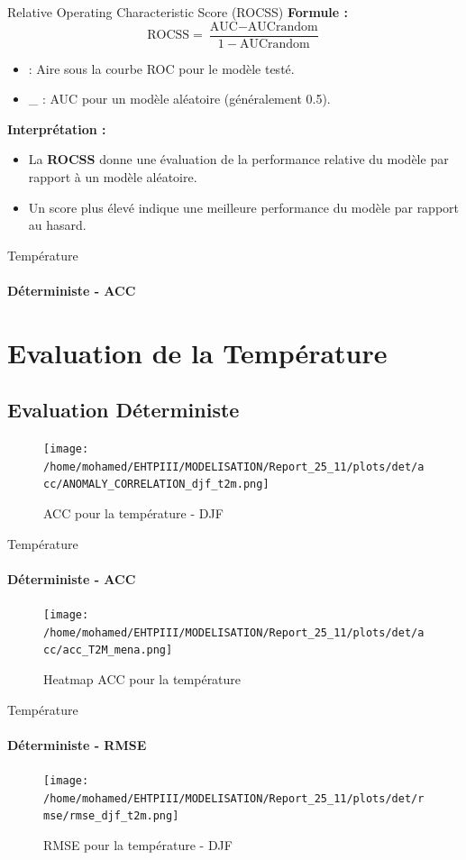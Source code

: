 \begin{frame}{Relative Operating Characteristic Score (ROCSS)}
  \textbf{Formule :}
  \[
  \text{ROCSS} = \frac{\text{AUC} - \text{AUC}\text{random}}{1 - \text{AUC}\text{random}}
  \]
  \begin{itemize}
  \item {} : Aire sous la courbe ROC pour le modèle testé.
  \item {}\_ : AUC pour un modèle aléatoire (généralement 0.5).
  \end{itemize}
  
  \textbf{Interprétation :}
  \begin{itemize}
      \item La \textbf{ROCSS} donne une évaluation de la performance relative du modèle par rapport à un modèle aléatoire.
      \item Un score plus élevé indique une meilleure performance du modèle par rapport au hasard.
  \end{itemize}
\end{frame}
\begin{frame}{Température}
\framesubtitle{Déterministe - ACC}

\section{Evaluation de la Température}
\subsection{Evaluation Déterministe}
\begin{figure}
    \centering
    \texttt{[image: /home/mohamed/EHTPIII/MODELISATION/Report\_25\_11/plots/det/acc/ANOMALY\_CORRELATION\_djf\_t2m.png]}
    \caption{ACC pour la température - DJF  }
    \label{fig:enter-label}
\end{figure}
\end{frame}

\begin{frame}{Température}
\framesubtitle{Déterministe - ACC}

\begin{figure}
    \centering
    \texttt{[image: /home/mohamed/EHTPIII/MODELISATION/Report\_25\_11/plots/det/acc/acc\_T2M\_mena.png]}
    \caption{Heatmap ACC pour la température }
    \label{fig:enter-label}
\end{figure}
\end{frame}

\begin{frame}{Température}
\framesubtitle{Déterministe - RMSE}

\begin{figure}
    \centering
    \texttt{[image: /home/mohamed/EHTPIII/MODELISATION/Report\_25\_11/plots/det/rmse/rmse\_djf\_t2m.png]}
    \caption{RMSE pour la température - DJF  }
    \label{fig:enter-label}
\end{figure}
\end{frame}

